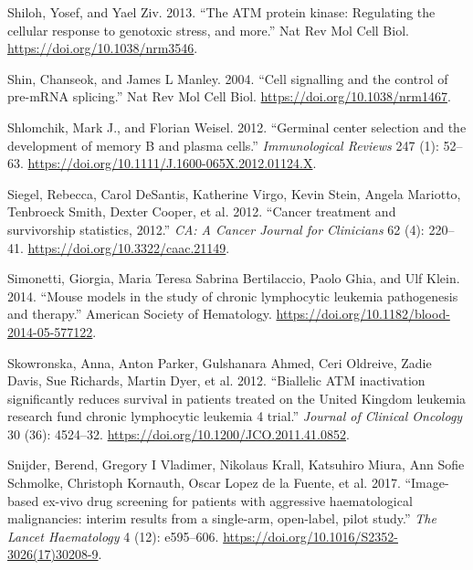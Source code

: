 \documentclass[11pt, a4paper, twosided]{book}
\newenvironment{CSLReferences}%
  {}%
  {\par}
\begin{document}
\begin{CSLReferences}{1}{0}
\leavevmode{}%
Shiloh, Yosef, and Yael Ziv. 2013. {``{The ATM protein kinase: Regulating the cellular response to genotoxic stress, and more}.''} Nat Rev Mol Cell Biol. \url{https://doi.org/10.1038/nrm3546}.

\leavevmode{}%
Shin, Chanseok, and James L Manley. 2004. {``{Cell signalling and the control of pre-mRNA splicing}.''} Nat Rev Mol Cell Biol. \url{https://doi.org/10.1038/nrm1467}.

\leavevmode{}%
Shlomchik, Mark J., and Florian Weisel. 2012. {``{Germinal center selection and the development of memory B and plasma cells}.''} \emph{Immunological Reviews} 247 (1): 52--63. \url{https://doi.org/10.1111/J.1600-065X.2012.01124.X}.

\leavevmode{}%
Siegel, Rebecca, Carol DeSantis, Katherine Virgo, Kevin Stein, Angela Mariotto, Tenbroeck Smith, Dexter Cooper, et al. 2012. {``{Cancer treatment and survivorship statistics, 2012}.''} \emph{CA: A Cancer Journal for Clinicians} 62 (4): 220--41. \url{https://doi.org/10.3322/caac.21149}.

\leavevmode{}%
Simonetti, Giorgia, Maria Teresa Sabrina Bertilaccio, Paolo Ghia, and Ulf Klein. 2014. {``{Mouse models in the study of chronic lymphocytic leukemia pathogenesis and therapy}.''} American Society of Hematology. \url{https://doi.org/10.1182/blood-2014-05-577122}.

\leavevmode{}%
Skowronska, Anna, Anton Parker, Gulshanara Ahmed, Ceri Oldreive, Zadie Davis, Sue Richards, Martin Dyer, et al. 2012. {``{Biallelic ATM inactivation significantly reduces survival in patients treated on the United Kingdom leukemia research fund chronic lymphocytic leukemia 4 trial}.''} \emph{Journal of Clinical Oncology} 30 (36): 4524--32. \url{https://doi.org/10.1200/JCO.2011.41.0852}.

\leavevmode{}%
Snijder, Berend, Gregory I Vladimer, Nikolaus Krall, Katsuhiro Miura, Ann Sofie Schmolke, Christoph Kornauth, Oscar Lopez de la Fuente, et al. 2017. {``{Image-based ex-vivo drug screening for patients with aggressive haematological malignancies: interim results from a single-arm, open-label, pilot study}.''} \emph{The Lancet Haematology} 4 (12): e595--606. \url{https://doi.org/10.1016/S2352-3026(17)30208-9}.


\end{CSLReferences}
\end{document}
